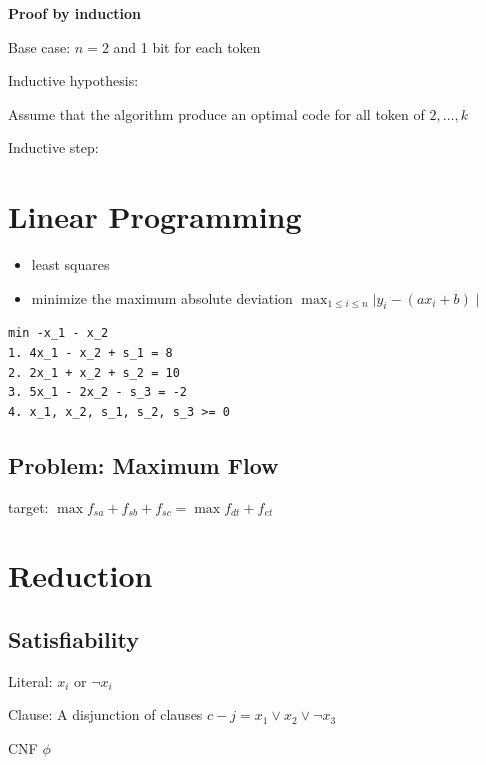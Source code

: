 \documentclass[12pt,a4paper]{article}
\begin{document}
\textbf{Proof by induction}

Base case: $n=2$ and 1 bit for each token

Inductive hypothesis: 

Assume that the algorithm produce an optimal code for all token of $2,\dots,k$

Inductive step:

\section*{Linear Programming}

\begin{itemize}
    \item least squares
    \item minimize the maximum absolute deviation \(\max_{1\leq i \leq n}{\mid y_i - (ax_i+b) \mid}\)
\end{itemize}

\begin{verbatim}
min -x_1 - x_2
1. 4x_1 - x_2 + s_1 = 8
2. 2x_1 + x_2 + s_2 = 10
3. 5x_1 - 2x_2 - s_3 = -2
4. x_1, x_2, s_1, s_2, s_3 >= 0
\end{verbatim}

\subsection*{Problem: Maximum Flow}

target: \(\max{f_{sa} + f_{sb} +f_{sc}} = \max{f_{dt} + f_{et}}\)

\section*{Reduction}

\subsection{Satisfiability}

Literal: $x_i$ or $\neg x_i$

Clause: A disjunction of clauses $c-j = x_1 \lor x_2 \lor \neg x_3$

CNF $\phi$
\end{document}
